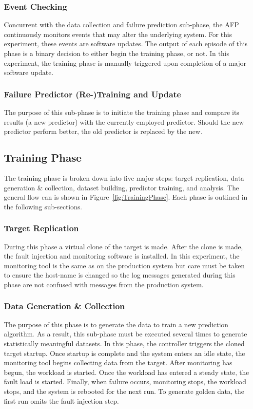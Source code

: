 \subsubsection{Event Checking}
Concurrent with the data collection and failure prediction sub-phase, the AFP
continuously monitors events that may alter the underlying system.  For this
experiment, these events are software updates.  The output of each episode of
this phase is a binary decision to either begin the training phase, or not.  In
this experiment, the training phase is manually triggered upon completion of a
major software update.

\subsubsection{Failure Predictor (Re-)Training and Update}
The purpose of this sub-phase is to initiate the training phase and compare its
results (a new predictor) with the currently employed predictor.  Should the
new predictor perform better, the old predictor is replaced by the new.

\subsection{Training Phase}
The training phase is broken down into five major steps:  target replication,
data generation \& collection, dataset building, predictor training, and
analysis.  The general flow can is shown in Figure~\ref{fig:TrainingPhase}.
Each phase is outlined in the following sub-sections.

\figTrainingPhase{4in}

\subsubsection{Target Replication}
During this phase a virtual clone of the target is made.  After the clone is
made, the fault injection and monitoring software is installed.  In this
experiment, the monitoring tool is the same as on the production system but
care must be taken to ensure the host-name is changed so the log messages
generated during this phase are not confused with messages from the production
system.

\subsubsection{Data Generation \& Collection}
The purpose of this phase is to generate the data to train a new prediction
algorithm.  As a result, this sub-phase must be executed several times to
generate statistically meaningful datasets.  In this phase, the controller
triggers the cloned target startup.  Once startup is complete and the system
enters an idle state, the monitoring tool begins collecting data from the
target.  After monitoring has begun, the workload is started.  Once the
workload has entered a steady state, the fault load is started.  Finally, when
failure occurs, monitoring stops, the workload stops, and the system is
rebooted for the next run.  To generate golden data, the first run omits the
fault injection step.

